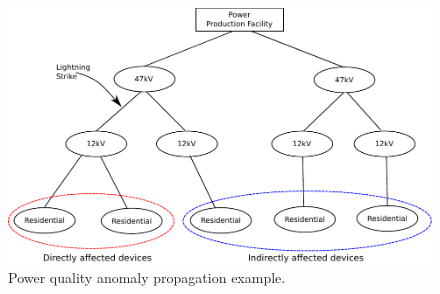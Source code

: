 \begin{figure}[h]
	\centering
	  \includegraphics[width=0.9\linewidth]{img/grid_hierarchy_cartoon.pdf}
	  \caption{Power quality anomaly propagation example.}
	  \label{intro:fig2}
\end{figure}

